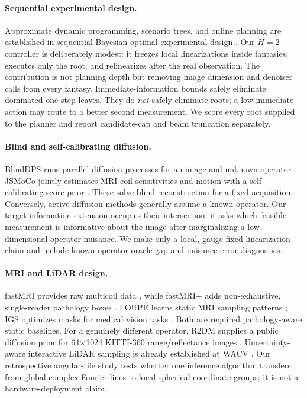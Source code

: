 \paragraph{Sequential experimental design.}
Approximate dynamic programming, scenario trees, and online planning are
established in sequential Bayesian optimal experimental design
\cite{huan2016soed,guo2026copex}.  Our $H=2$ controller is deliberately modest:
it freezes local linearizations inside fantasies, executes only the root, and
relinearizes after the real observation.  The contribution is not planning
depth but removing image dimension and denoiser calls from every fantasy.
Immediate-information bounds safely eliminate dominated one-step leaves.
They do \emph{not} safely eliminate roots; a low-immediate action may route to
a better second measurement.  We score every root supplied to the planner and
report candidate-cap and beam truncation separately.

\paragraph{Blind and self-calibrating diffusion.}
BlindDPS runs parallel diffusion processes for an image and unknown operator
\cite{chung2023blinddps}.  JSMoCo jointly estimates MRI coil sensitivities and
motion with a self-calibrating score prior \cite{chen2025jsmoco}.  These solve
blind reconstruction for a fixed acquisition.  Conversely, active diffusion
methods generally assume a known operator.  Our target-information extension
occupies their intersection: it asks which feasible measurement is informative
about the image after marginalizing a low-dimensional operator nuisance.  We
make only a local, gauge-fixed linearization claim and include known-operator
oracle-gap and nuisance-error diagnostics.

\paragraph{MRI and LiDAR design.}
fastMRI provides raw multicoil data \cite{knoll2020fastmri}, while fastMRI+
adds non-exhaustive, single-reader pathology boxes
\cite{zhao2022fastmriplus}.  LOUPE learns static MRI sampling patterns
\cite{bahadir2020loupe}; IGS optimizes masks for medical vision tasks
\cite{razumov2023igs}.  Both are required pathology-aware static baselines.
For a genuinely different operator, R2DM supplies a public diffusion prior for
64$\times$1024 KITTI-360 range/reflectance images
\cite{nakashima2024r2dm,liao2023kitti360}.  Uncertainty-aware interactive
LiDAR sampling is already established at WACV
\cite{taguchi2023uncertainty}.  Our retrospective angular-tile study tests
whether one inference algorithm transfers from global complex Fourier lines
to local spherical coordinate groups; it is not a hardware-deployment claim.
